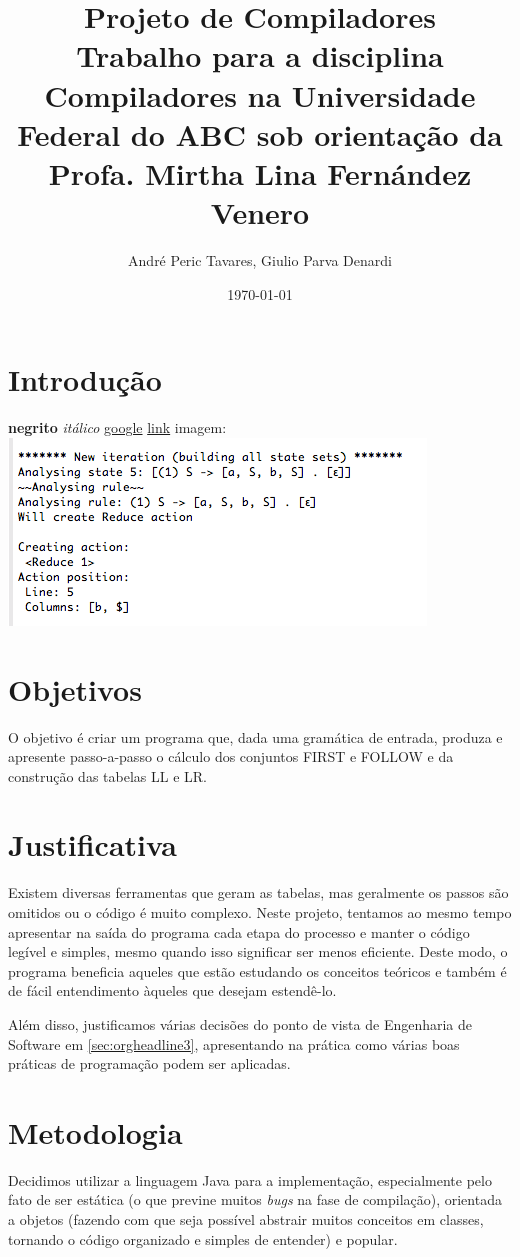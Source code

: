\documentclass[11pt]{article}
\author{André Peric Tavares, Giulio Parva Denardi}
\date{\today}
\title{Projeto de Compiladores\\\medskip
\large Trabalho para a disciplina Compiladores na Universidade Federal do ABC sob orientação da Profa. Mirtha Lina Fernández Venero}
\begin{document}
\maketitle
\tableofcontents


\section{Introdução}
\label{sec:orgheadline1}
\textbf{negrito}
\emph{itálico}
\href{https://google.com}{google}
\hyperref[sec:orgheadline1]{link}
imagem:
\includegraphics[width=.9\linewidth]{./media/Screenshot 2016-04-25 17.54.18.png}

\section{Objetivos}
\label{sec:orgheadline2}
O objetivo é criar um programa que, dada uma gramática de entrada,
produza e apresente passo-a-passo o cálculo dos conjuntos FIRST e FOLLOW e da
construção das tabelas LL e LR.
\section{Justificativa}
\label{sec:orgheadline4}
Existem diversas ferramentas que geram as tabelas, mas geralmente os passos são
omitidos ou o código é muito complexo. Neste projeto, tentamos ao mesmo tempo
apresentar na saída do programa cada etapa do processo e manter o código
legível e simples, mesmo quando isso significar ser menos eficiente. Deste modo,
o programa beneficia aqueles que estão estudando os conceitos teóricos e também
é de fácil entendimento àqueles que desejam estendê-lo.

Além disso, justificamos várias decisões do ponto de vista de Engenharia de
Software em \ref{sec:orgheadline3}, apresentando na
prática como várias boas práticas de programação podem ser aplicadas.

\section{Metodologia}
\label{sec:orgheadline5}
Decidimos utilizar a linguagem Java para a implementação, especialmente pelo
fato de ser estática (o que previne muitos \emph{bugs} na fase de compilação),
orientada a objetos (fazendo com que seja possível abstrair muitos conceitos em
classes, tornando o código organizado e simples de entender) e popular.
\end{document}
